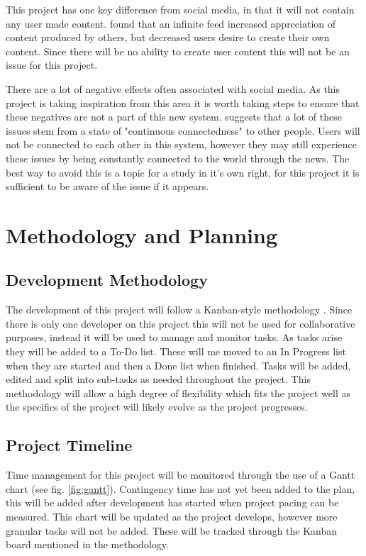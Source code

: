 \documentclass[12pt,titlepage]{article}
\begin{document}
  This project has one key difference from social media, in that it will not
  contain any user made content. \cite{zhang} found that an infinite feed
  increased appreciation of content produced by others, but decreased users
  desire to create their own content. Since there will be no ability to create
  user content this will not be an issue for this project.

  There are a lot of negative effects often associated with social media. As
  this project is taking inspiration from this area it is worth taking steps to
  ensure that these negatives are not a part of this new system.
  \cite{lupinacci} suggests that a lot of these issues stem from a state of
  "continuous connectedness" to other people. Users will not be connected to
  each other in this system, however they may still experience these issues by
  being constantly connected to the world through the news. The best way to
  avoid this is a topic for a study in it's own right, for this project it is
  sufficient to be aware of the issue if it appears.

\section{Methodology and Planning}

  \subsection{Development Methodology}

  The development of this project will follow a Kanban-style methodology
  \citep{kanban}. Since there is only one developer on this project this will not
  be used for collaborative purposes, instead it will be used to manage and
  monitor tasks. As tasks arise they will be added to a To-Do list. These will
  me moved to an In Progress list when they are started and then a Done list
  when finished. Tasks will be added, edited and split into sub-tasks as needed
  throughout the project. This methodology will allow a high degree of
  flexibility which fits the project well as the specifics of the project will
  likely evolve as the project progresses.

  \subsection{Project Timeline}

  Time management for this project will be monitored through the use of a Gantt
  chart (see fig. \ref{fig:gantt}). Contingency time has not yet been added to
  the plan, this will be added after development has started when project pacing
  can be measured. This chart will be updated as the project develops, however
  more granular tasks will not be added. These will be tracked through the
  Kanban board mentioned in the methodology.
\end{document}
